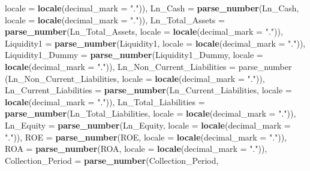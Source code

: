 \documentclass[
]{article}
\newenvironment{Shaded}{\begin{snugshade}}{\end{snugshade}}
\newcommand{\AttributeTok}[1]{\textcolor[rgb]{0.13,0.29,0.53}{#1}}
\newcommand{\FunctionTok}[1]{\textcolor[rgb]{0.13,0.29,0.53}{\textbf{#1}}}
\newcommand{\NormalTok}[1]{#1}
\newcommand{\StringTok}[1]{\textcolor[rgb]{0.31,0.60,0.02}{#1}}
\begin{document}
\begin{Shaded}
\begin{Highlighting}[]
                                   \AttributeTok{locale =} \FunctionTok{locale}\NormalTok{(}\AttributeTok{decimal\_mark =} \StringTok{"."}\NormalTok{)),}
    \AttributeTok{Ln\_Cash =} \FunctionTok{parse\_number}\NormalTok{(Ln\_Cash, }\AttributeTok{locale =} 
                             \FunctionTok{locale}\NormalTok{(}\AttributeTok{decimal\_mark =} \StringTok{"."}\NormalTok{)),}
    \AttributeTok{Ln\_Total\_Assets =} \FunctionTok{parse\_number}\NormalTok{(Ln\_Total\_Assets, }
                                   \AttributeTok{locale =} \FunctionTok{locale}\NormalTok{(}\AttributeTok{decimal\_mark =} \StringTok{"."}\NormalTok{)),}
    \AttributeTok{Liquidity1 =} \FunctionTok{parse\_number}\NormalTok{(Liquidity1, }
                              \AttributeTok{locale =} \FunctionTok{locale}\NormalTok{(}\AttributeTok{decimal\_mark =} \StringTok{"."}\NormalTok{)),}
    \AttributeTok{Liquidity1\_Dummy =} \FunctionTok{parse\_number}\NormalTok{(Liquidity1\_Dummy, }
                                    \AttributeTok{locale =} \FunctionTok{locale}\NormalTok{(}\AttributeTok{decimal\_mark =} \StringTok{"."}\NormalTok{)),}
    \AttributeTok{Ln\_Non\_Current\_Liabilities =}\NormalTok{ parse\_number}
\NormalTok{    (Ln\_Non\_Current\_Liabilities, }
      \AttributeTok{locale =} \FunctionTok{locale}\NormalTok{(}\AttributeTok{decimal\_mark =} \StringTok{"."}\NormalTok{)),}
    \AttributeTok{Ln\_Current\_Liabilities =} \FunctionTok{parse\_number}\NormalTok{(Ln\_Current\_Liabilities, }
                                          \AttributeTok{locale =} \FunctionTok{locale}\NormalTok{(}\AttributeTok{decimal\_mark =} \StringTok{"."}\NormalTok{)),}
    \AttributeTok{Ln\_Total\_Liabilities =} \FunctionTok{parse\_number}\NormalTok{(Ln\_Total\_Liabilities, }
                                        \AttributeTok{locale =} \FunctionTok{locale}\NormalTok{(}\AttributeTok{decimal\_mark =} \StringTok{"."}\NormalTok{)),}
    \AttributeTok{Ln\_Equity =} \FunctionTok{parse\_number}\NormalTok{(Ln\_Equity, }
                             \AttributeTok{locale =} \FunctionTok{locale}\NormalTok{(}\AttributeTok{decimal\_mark =} \StringTok{"."}\NormalTok{)),}
    \AttributeTok{ROE =} \FunctionTok{parse\_number}\NormalTok{(ROE, }\AttributeTok{locale =} 
                         \FunctionTok{locale}\NormalTok{(}\AttributeTok{decimal\_mark =} \StringTok{"."}\NormalTok{)),}
    \AttributeTok{ROA =} \FunctionTok{parse\_number}\NormalTok{(ROA, }
                       \AttributeTok{locale =} \FunctionTok{locale}\NormalTok{(}\AttributeTok{decimal\_mark =} \StringTok{"."}\NormalTok{)),}
    \AttributeTok{Collection\_Period =} \FunctionTok{parse\_number}\NormalTok{(Collection\_Period, }

\end{Highlighting}
\end{Shaded}
\end{document}
